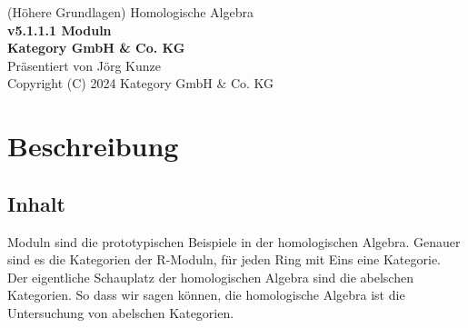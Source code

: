 \documentclass[a4paper]{amsart}
\theoremstyle{definition}
\begin{document}
\begin{titlepage}
\centering
{\huge
(Höhere Grundlagen) Homologische Algebra\\[1cm]
\textbf{v5.1.1.1 Moduln}
}\\[1cm]

\textbf{Kategory GmbH \& Co. KG}\\
Präsentiert von Jörg Kunze\\
Copyright (C) 2024 Kategory GmbH \& Co. KG

\end{titlepage}

%

\newpage

\section*{Beschreibung}

\subsection*{Inhalt}
Moduln sind die prototypischen Beispiele in der homologischen Algebra. Genauer sind es die Kategorien der R-Moduln, für jeden Ring mit Eins eine Kategorie. Der eigentliche Schauplatz der homologischen Algebra sind die abelschen Kategorien. So dass wir sagen können, die homologische Algebra ist die Untersuchung von abelschen Kategorien.
\end{document}
